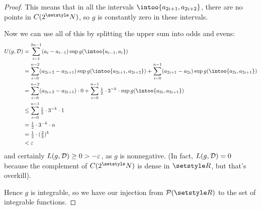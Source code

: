 \documentclass[fleqn,a4paper,11pt]{article}
\begin{document}
\begin{proof}
  This means that in all the intervals \(\intoo{a_{2i + 1}, a_{2i + 2}}\), there
  are no points in \(C(2^\N)\), so \(g\) is constantly zero in these intervals.

  Now we can use all of this by splitting the upper sum into odds and evens:
  \begin{align*}
   U(g, \dissD)
    &= \sum_{i = 1}^{2n - 1} (a_i - a_{i - 1}) \sup g(\intoo{a_{i - 1}, a_i}) \\
    &= \sum_{i = 0}^{n - 2}
            (a_{2i + 2} - a_{2i + 1}) \sup g(\intoo{a_{2i + 1}, a_{2i + 2}})
     + \sum_{i = 0}^{n - 1}
            (a_{2i + 1} - a_{2i}) \sup g(\intoo{a_{2i}, a_{2i + 1}}) \\
    &= \sum_{i = 0}^{n - 2}
            (a_{2i + 2} - a_{2i + 1}) \cdot 0
     + \sum_{i = 0}^{n - 1}
            \tfrac 12 \cdot 3^{-k} \cdot \sup g(\intoo{a_{2i}, a_{2i + 1}}) \\
    &\le \sum_{i = 0}^{n - 1}
              \tfrac 12 \cdot 3^{-k} \cdot 1 \\
    &= \tfrac 12 \cdot 3^{-k} \cdot n \\
    &= \tfrac 12 \cdot (\tfrac 23)^k \\
    &< \epsilon
  \end{align*}
  and certainly \(L(g, \mathcal D) \ge 0 > -\varepsilon\), as \(g\) is nonnegative. (In
  fact, \(L(g, \mathcal D) = 0\) because the complement of \(C(2^\N)\) is dense in
  \(\R\), but that's overkill).

  Hence \(g\) is integrable, so we have our injection from \(\powerset(\R)\) to
  the set of integrable functions.
 \end{proof}
\end{document}

